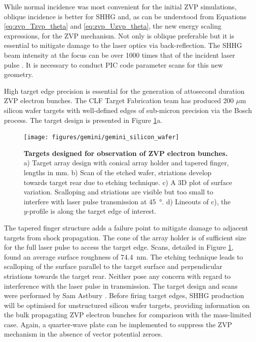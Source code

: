 While normal incidence was most convenient for the initial ZVP simulations, oblique incidence is better for \ac{SHHG} \cite{gonoskovUltrarelativisticNanoplasmonicsRoute2011, edwardsXRayEmissionEffectiveness2020} and, as can be understood from Equations \ref{eq:zvp_Tzvp_theta} and \ref{eq:zvp_Uzvp_theta}, the new energy scaling expressions, for the ZVP mechanism. Not only is oblique preferable but it is essential to mitigate damage to the laser optics via back-reflection. The \ac{SHHG} beam intensity at the focus can be over 1000 times that of the incident laser pulse \cite{quereReflectingPetawattLasers2021}. It is necessary to conduct PIC code parameter scans for this new geometry.

High target edge precision is essential for the generation of attosecond duration ZVP electron bunches. The CLF Target Fabrication team has produced 200 $\mu$m silicon wafer targets with well-defined edges of sub-micron precision via the Bosch process. The target design is presented in Figure \ref{fig:geminisiliconwafer}a.
\begin{figure}
	\centering
	\texttt{[image: figures/gemini/gemini\_silicon\_wafer]}
	\caption[Attosecond ZVP electron bunch targets]{\textbf{Targets designed for observation of ZVP electron bunches.} a) Target array design with conical array holder and tapered finger, lengths in mm. b) Scan of the etched wafer, striations develop towards target rear due to etching technique. c) A 3D plot of surface variation. Scalloping and striations are visible but too small to interfere with laser pulse transmission at \qty{45}{\degree}. d) Lineouts of c), the $y$-profile is along the target edge of interest.}
	\label{fig:geminisiliconwafer}
\end{figure}
The tapered finger structure adds a failure point to mitigate damage to adjacent targets from shock propagation. The cone of the array holder is of sufficient size for the full laser pulse to access the target edge. Scans, detailed in Figure \ref{fig:geminisiliconwafer}, found an average surface roughness of \qty{74.4}{nm}. The etching technique leads to scalloping of the surface parallel to the target surface and perpendicular striations towards the target rear. Neither pose any concern with regard to interference with the laser pulse in transmission. The target design and scans were performed by Sam Astbury \cite{astburyTargetFabricationGroup2024}. Before firing target edges, SHHG production will be optimised for unstructured silicon wafer targets, providing information on the bulk propagating ZVP electron bunches for comparison with the mass-limited case. Again, a quarter-wave plate can be implemented to suppress the ZVP mechanism in the absence of vector potential zeroes.

